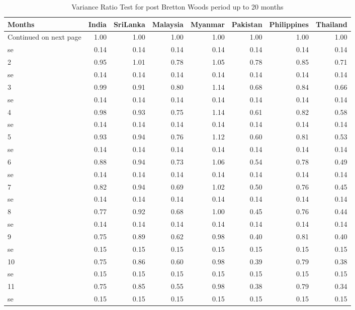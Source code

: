 \documentclass[11pt,preprint, authoryear]{elsarticle}
\numberwithin{equation}{section}
\numberwithin{figure}{section}
\numberwithin{table}{section}
\begin{document}
\begingroup\fontsize{12pt}{13pt}\selectfont
\begin{longtable}{lrrrrrrr}
\caption{Variance Ratio Test for post Bretton Woods period up to 20 months} \\ 
  \toprule
Months & India & SriLanka & Malaysia & Myanmar & Pakistan & Philippines & Thailand \\ 
  \hline 
\endhead 
\hline 
{\footnotesize Continued on next page} 
\endfoot 
\endlastfoot 
 \midrule
1 & 1.00 & 1.00 & 1.00 & 1.00 & 1.00 & 1.00 & 1.00 \\ 
  se & 0.14 & 0.14 & 0.14 & 0.14 & 0.14 & 0.14 & 0.14 \\ 
  2 & 0.95 & 1.01 & 0.78 & 1.05 & 0.78 & 0.85 & 0.71 \\ 
  se & 0.14 & 0.14 & 0.14 & 0.14 & 0.14 & 0.14 & 0.14 \\ 
  3 & 0.99 & 0.91 & 0.80 & 1.14 & 0.68 & 0.84 & 0.66 \\ 
  se & 0.14 & 0.14 & 0.14 & 0.14 & 0.14 & 0.14 & 0.14 \\ 
  4 & 0.98 & 0.93 & 0.75 & 1.14 & 0.61 & 0.82 & 0.58 \\ 
  se & 0.14 & 0.14 & 0.14 & 0.14 & 0.14 & 0.14 & 0.14 \\ 
  5 & 0.93 & 0.94 & 0.76 & 1.12 & 0.60 & 0.81 & 0.53 \\ 
  se & 0.14 & 0.14 & 0.14 & 0.14 & 0.14 & 0.14 & 0.14 \\ 
  6 & 0.88 & 0.94 & 0.73 & 1.06 & 0.54 & 0.78 & 0.49 \\ 
  se & 0.14 & 0.14 & 0.14 & 0.14 & 0.14 & 0.14 & 0.14 \\ 
  7 & 0.82 & 0.94 & 0.69 & 1.02 & 0.50 & 0.76 & 0.45 \\ 
  se & 0.14 & 0.14 & 0.14 & 0.14 & 0.14 & 0.14 & 0.14 \\ 
  8 & 0.77 & 0.92 & 0.68 & 1.00 & 0.45 & 0.76 & 0.44 \\ 
  se & 0.14 & 0.14 & 0.14 & 0.14 & 0.14 & 0.14 & 0.14 \\ 
  9 & 0.75 & 0.89 & 0.62 & 0.98 & 0.40 & 0.81 & 0.40 \\ 
  se & 0.15 & 0.15 & 0.15 & 0.15 & 0.15 & 0.15 & 0.15 \\ 
  10 & 0.75 & 0.86 & 0.60 & 0.98 & 0.39 & 0.79 & 0.38 \\ 
  se & 0.15 & 0.15 & 0.15 & 0.15 & 0.15 & 0.15 & 0.15 \\ 
  11 & 0.75 & 0.85 & 0.55 & 0.98 & 0.38 & 0.79 & 0.34 \\ 
  se & 0.15 & 0.15 & 0.15 & 0.15 & 0.15 & 0.15 & 0.15 \\ 

\end{longtable}
\end{document}
